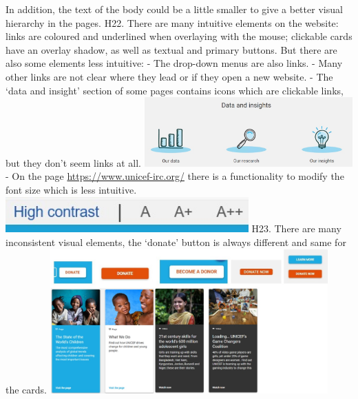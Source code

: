 \newline In addition, the text of the body could be a little smaller to give a better visual hierarchy in the pages.
\newline
\newline H22.	There are many intuitive elements on the website: links are coloured and underlined when overlaying with the mouse; clickable cards have an overlay shadow, as well as textual and primary buttons.
\newline But there are also some elements less intuitive:
\newline -	The drop-down menus are also links.
\newline -	Many other links are not clear where they lead or if they open a new website.
\newline -	The ‘data and insight’ section of some pages contains icons which are clickable links, but they don’t seem links at all.
\newline \includegraphics[width=0.6\textwidth]{FinalScores25.jpg}
\newline -	On the page \href{https://www.unicef-irc.org/}{https://www.unicef-irc.org/} there is a functionality to modify the font size which is less intuitive.
\newline \includegraphics[width=0.7\textwidth]{FinalScores26.jpg}
\newline
\newline H23.	There are many inconsistent visual elements, the ‘donate’ button is always different and same for the cards.
\newline \includegraphics[width=0.8\textwidth]{FinalScores27.jpg}
